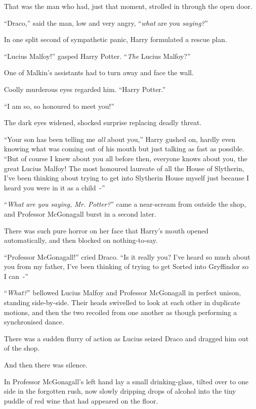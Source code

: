 That was the man who had, just that moment, strolled in through the open door.

``Draco,'' said the man, low and very angry, ``\emph{what} are you \emph{saying?}''

In one split second of sympathetic panic, Harry formulated a rescue plan.

``Lucius Malfoy!'' gasped Harry Potter. ``\emph{The} Lucius Malfoy?''

One of Malkin's assistants had to turn away and face the wall.

Coolly murderous eyes regarded him. ``Harry Potter.''

``I am so, so honoured to meet you!''

The dark eyes widened, shocked surprise replacing deadly threat.

``Your son has been telling me \emph{all} about you,'' Harry gushed on, hardly even knowing what was coming out of his mouth but just talking as fast as possible. ``But of course I knew about you all before then, everyone knows about you, the great Lucius Malfoy! The most honoured laureate of all the House of Slytherin, I've been thinking about trying to get into Slytherin House myself just because I heard you were in it as a child~-''

``\emph{What are you saying, Mr. Potter?}'' came a near-scream from outside the shop, and Professor McGonagall burst in a second later.

There was such pure horror on her face that Harry's mouth opened automatically, and then blocked on nothing-to-say.

``Professor McGonagall!'' cried Draco. ``Is it really you? I've heard so much about you from my father, I've been thinking of trying to get Sorted into Gryffindor so I can~-''

``\emph{What?}'' bellowed Lucius Malfoy and Professor McGonagall in perfect unison, standing side-by-side. Their heads swivelled to look at each other in duplicate motions, and then the two recoiled from one another as though performing a synchronised dance.

There was a sudden flurry of action as Lucius seized Draco and dragged him out of the shop.

And then there was silence.

In Professor McGonagall's left hand lay a small drinking-glass, tilted over to one side in the forgotten rush, now slowly dripping drops of alcohol into the tiny puddle of red wine that had appeared on the floor.

